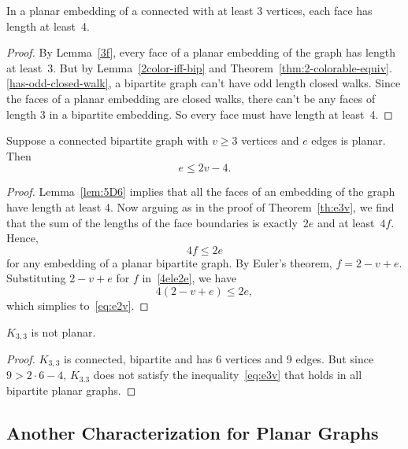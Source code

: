 \begin{lemma}\label{lem:5D6}
In a planar embedding of a connected  with at
least 3 vertices, each face has length at least~4.
\end{lemma}

\begin{proof}
  By Lemma~\ref{3f}, every face of a planar embedding of the graph has
  length at least~3.  But by Lemma~\ref{2color-iff-bip} and
  Theorem~\ref{thm:2-colorable-equiv}.\ref{has-odd-closed-walk}, a
    bipartite graph can't have odd length closed walks.  Since the faces
    of a planar embedding are closed walks, there can't be any faces of
    length 3 in a bipartite embedding.  So every face must have length at
    least~4.
\end{proof}

\begin{theorem}\label{th:e2v}
Suppose a connected bipartite graph with $v \geq 3$ vertices and $e$ edges
is planar.  Then
\begin{equation}\label{eq:e2v}
    e \leq 2v-4.
\end{equation}
\end{theorem}

\begin{proof}
  Lemma~\ref{lem:5D6} implies that all the faces of an embedding of the
  graph have length at least 4.  Now arguing as in the proof of
  Theorem~\ref{th:e3v}, we find that the sum of the lengths of the face
  boundaries is exactly~$2e$ and at least~$4f$.  Hence,
\begin{equation}\label{4ele2e}
    4f \le 2e
\end{equation}
for any embedding of a planar bipartite graph.  By Euler's theorem,
$f=2-v+e$.  Substituting $2-v+e$ for $f$ in~\eqref{4ele2e}, we have
\[
4(2-v+e) \leq 2e,
\]
which simplies to~\eqref{eq:e2v}.
\end{proof}

\begin{corollary}\label{cor:K33-nonplanar} %
$K_{3, 3}$ is not planar.
\end{corollary}

\begin{proof}
  $K_{3,3}$ is connected, bipartite and has 6 vertices and 9 edges.  But
  since $ 9 > 2 \cdot 6-4$, $K_{3.3}$ does not satisfy the
  inequality~\eqref{eq:e3v} that holds in all bipartite planar graphs.
\end{proof}

\subsection{Another Characterization for Planar Graphs}


